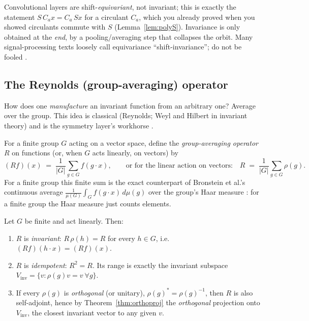 \begin{remark}
Convolutional layers are shift-\emph{equivariant}, not invariant; this is exactly the
statement $S\,C_a x = C_a\,S x$ for a circulant $C_a$, which you already proved when you
showed circulants commute with $S$ (Lemma~\ref{lem:polyS}). Invariance is only obtained
at the \emph{end}, by a pooling/averaging step that collapses the orbit. Many
signal-processing texts loosely call equivariance ``shift-invariance''; do not be
fooled \citep{groups_bronstein}.
\end{remark}

\subsection{The Reynolds (group-averaging) operator}

How does one \emph{manufacture} an invariant function from an arbitrary one? Average
over the group. This idea is classical (Reynolds; Weyl and Hilbert in invariant theory)
and is the symmetry layer's workhorse \citep{groups_bronstein}.

\begin{definition}
\label{def:reynolds}
For a finite group $G$ acting on a vector space, define the \emph{group-averaging
operator} $R$ on functions (or, when $G$ acts linearly, on vectors) by
\[
  (R f)(x) \;=\; \frac{1}{|G|} \sum_{g \in G} f(g \cdot x),
  \qquad\text{or for the linear action on vectors:}\quad
  R \;=\; \frac{1}{|G|} \sum_{g \in G} \rho(g).
\]
For a finite group this finite sum is the exact counterpart of Bronstein et al.'s
continuous average $\tfrac{1}{\mu(G)} \int_G f(g\cdot x)\,d\mu(g)$ over the group's
Haar measure \citep{groups_bronstein}: for a finite group the Haar measure just counts
elements.
\end{definition}

\begin{theorem}
\label{thm:reynolds}
Let $G$ be finite and act linearly. Then:
\begin{enumerate}[label=\textup{(\roman*)}]
  \item $R$ is \emph{invariant}: $R\,\rho(h) = R$ for every $h \in G$, i.e.\ $(Rf)(h\cdot
        x) = (Rf)(x)$.
  \item $R$ is \emph{idempotent}: $R^2 = R$. Its range is exactly the invariant
        subspace $V_{\mathrm{inv}} = \{v : \rho(g)v = v\ \forall g\}$.
  \item If every $\rho(g)$ is \emph{orthogonal} (or unitary), $\rho(g)^\ast =
        \rho(g)^{-1}$, then $R$ is also self-adjoint, hence by
        Theorem~\ref{thm:orthoproj} the \emph{orthogonal} projection onto
        $V_{\mathrm{inv}}$, the closest invariant vector to any given $v$.
\end{enumerate}
\end{theorem}

